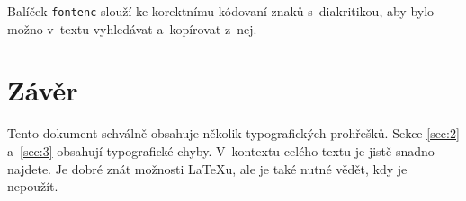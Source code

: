 \documentclass[a4paper, 10 pt, twocolumn]{article}
\begin{document}
Balíček \texttt{fontenc} slouží ke korektnímu kódovaní znaků s~diakritikou, aby bylo možno v~textu vyhledávat a~kopírovat z~nej.

\section{Závěr}
Tento dokument schválně obsahuje několik typografických prohřešků. Sekce \ref{sec:2} a~\ref{sec:3} obsahují typografické chyby. V~kontextu celého textu je jistě snadno najdete. Je dobré znát možnosti {\LaTeX}u, ale je také nutné vědět, kdy je nepoužít.
\end{document}
